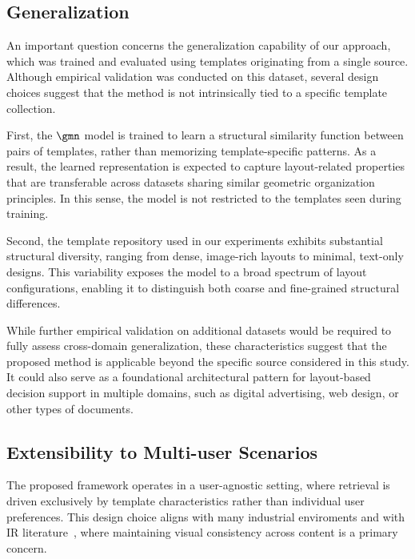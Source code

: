 \subsection{Generalization}
\label{sec:discussion:generalization}

An important question concerns the generalization capability of our approach, which was trained and evaluated using templates originating from a single source. Although empirical validation was conducted on this dataset, several design choices suggest that the method is not intrinsically tied to a specific template collection.

First, the $\gmn$ model is trained to learn a structural similarity function between pairs of templates, rather than memorizing template-specific patterns. As a result, the learned representation is expected to capture layout-related properties that are transferable across datasets sharing similar geometric organization principles. In this sense, the model is not restricted to the templates seen during training.

Second, the template repository used in our experiments exhibits substantial structural diversity, ranging from dense, image-rich layouts to minimal, text-only designs. This variability exposes the model to a broad spectrum of layout configurations, enabling it to distinguish both coarse and fine-grained structural differences.

While further empirical validation on additional datasets would be required to fully assess cross-domain generalization, these characteristics suggest that the proposed method is applicable beyond the specific source considered in this study. It could also serve as a foundational architectural pattern for layout-based decision support in multiple domains, such as digital advertising, web design, or other types of documents.


\subsection{Extensibility to Multi-user Scenarios}

The proposed framework operates in a user-agnostic setting, where retrieval is driven exclusively by template characteristics rather than individual user preferences. This design choice aligns with many industrial enviroments and with IR literature~\cite{wu-survey-2022}, where maintaining visual consistency across content is a primary concern.

